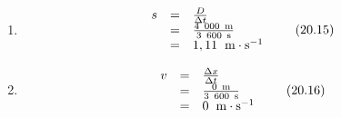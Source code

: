 {\begin{mdframed}[linewidth=4, leftmargin=40, rightmargin=40]
\begin{exercise}
\begin{enumerate}[noitemsep, label=\textbf{Step} \textbf{\arabic*}. ]
    \begin{equation}
    \Delta t=3\phantom{\rule{4pt}{0ex}}600\phantom{\rule{0.277778em}{0ex}}\mathrm{s}\tag{20.14}
      \end{equation}
      \item  
      \label{m38791*id65125}\nopagebreak\noindent{}
        
    \begin{equation}
    \begin{array}{ccc}\hfill s& =& \frac{D}{\Delta t}\hfill \\ & =& \frac{4\phantom{\rule{4pt}{0ex}}000\phantom{\rule{4pt}{0ex}}\mathrm{m}}{3\phantom{\rule{4pt}{0ex}}600\phantom{\rule{4pt}{0ex}}\mathrm{s}}\hfill \\ & =& 1,11\phantom{\rule{4pt}{0ex}}\phantom{\rule{0.166667em}{0ex}}\mathrm{m}\ensuremath{\cdot}{\mathrm{s}}^{-1}\hfill \end{array}\tag{20.15}
      \end{equation}
      \item  
      \label{m38791*id65249}\nopagebreak\noindent{}
        
    \begin{equation}
    \begin{array}{ccc}\hfill v& =& \frac{\Delta x}{\Delta t}\hfill \\ & =& \frac{0\phantom{\rule{4pt}{0ex}}\mathrm{m}}{3\phantom{\rule{4pt}{0ex}}600\phantom{\rule{4pt}{0ex}}\mathrm{s}}\hfill \\ & =& 0\phantom{\rule{4pt}{0ex}}\phantom{\rule{0.166667em}{0ex}}\mathrm{m}\ensuremath{\cdot}{\mathrm{s}}^{-1}\hfill \end{array}\tag{20.16}
      \end{equation}
      \end{enumerate}
    \end{exercise}
    \end{mdframed}
    }
    \noindent
      \label{m38791*uid37}

